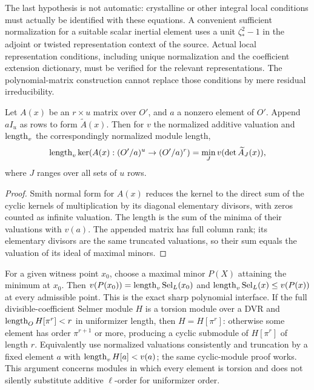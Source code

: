 \documentclass[11pt,a4paper]{article}
\begin{document}
The last hypothesis is not automatic: crystalline or other integral local conditions must actually be identified with these equations. A convenient sufficient normalization for a suitable scalar inertial element uses a unit $\zeta_*^2-1$ in the adjoint or twisted representation context of the source. Actual local representation conditions, including unique normalization and the coefficient extension dictionary, must be verified for the relevant representations. The polynomial-matrix construction cannot replace those conditions by mere residual irreducibility.

\begin{proposition}\label{prop:minors}
Let $A(x)$ be an $r\times u$ matrix over $O'$, and $a$ a nonzero element of $O'$. Append $aI_u$ as rows to form $\widetilde A(x)$. Then for $v$ the normalized additive valuation and $\operatorname{length}_v$ the correspondingly normalized module length,
\begin{equation}\label{eq:minors}
\operatorname{length}_v\ker(A(x):(O'/a)^u\to(O'/a)^r)=\min_J v(\det\widetilde A_J(x)),
\end{equation}
where $J$ ranges over all sets of $u$ rows.
\end{proposition}
\begin{proof}Smith normal form for $A(x)$ reduces the kernel to the direct sum of the cyclic kernels of multiplication by its diagonal elementary divisors, with zeros counted as infinite valuation. The length is the sum of the minima of their valuations with $v(a)$. The appended matrix has full column rank; its elementary divisors are the same truncated valuations, so their sum equals the valuation of its ideal of maximal minors.\end{proof}
For a given witness point $x_0$, choose a maximal minor $P(X)$ attaining the minimum at $x_0$. Then $v(P(x_0))=\operatorname{length}_v\operatorname{Sel}_L(x_0)$ and $\operatorname{length}_v\operatorname{Sel}_L(x)\leq v(P(x))$ at every admissible point. This is the exact sharp polynomial interface. If the full divisible-coefficient Selmer module $H$ is a torsion module over a DVR and $\operatorname{length}_O H[\pi^r]<r$ in uniformizer length, then $H=H[\pi^r]$: otherwise some element has order $\pi^{r+1}$ or more, producing a cyclic submodule of $H[\pi^r]$ of length $r$. Equivalently use normalized valuations consistently and truncation by a fixed element $a$ with $\operatorname{length}_v H[a]<v(a)$; the same cyclic-module proof works. This argument concerns modules in which every element is torsion and does not silently substitute additive $\ell$-order for uniformizer order.
\end{document}
